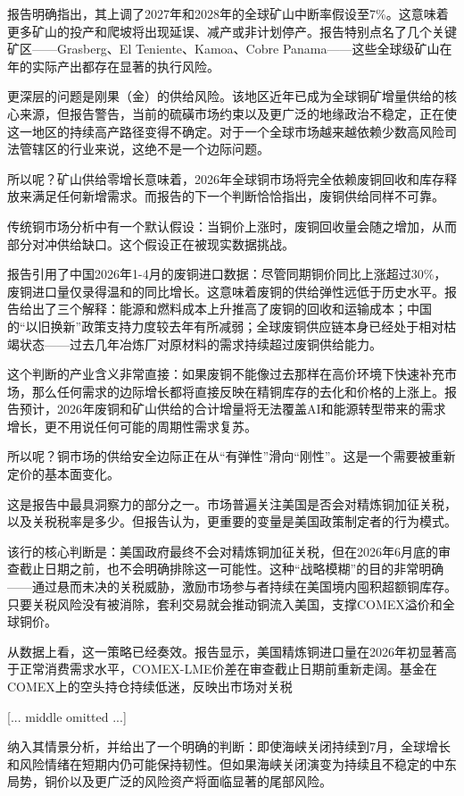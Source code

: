 \documentclass[11pt]{ctexart}
\begin{document}
报告明确指出，其上调了2027年和2028年的全球矿山中断率假设至7\%。这意味着更多矿山的投产和爬坡将出现延误、减产或非计划停产。报告特别点名了几个关键矿区——Grasberg、El Teniente、Kamoa、Cobre Panama——这些全球级矿山在 年的实际产出都存在显著的执行风险。

更深层的问题是刚果（金）的供给风险。该地区近年已成为全球铜矿增量供给的核心来源，但报告警告，当前的硫磺市场约束以及更广泛的地缘政治不稳定，正在使这一地区的持续高产路径变得不确定。对于一个全球市场越来越依赖少数高风险司法管辖区的行业来说，这绝不是一个边际问题。

所以呢？矿山供给零增长意味着，2026年全球铜市场将完全依赖废铜回收和库存释放来满足任何新增需求。而报告的下一个判断恰恰指出，废铜供给同样不可靠。

传统铜市场分析中有一个默认假设：当铜价上涨时，废铜回收量会随之增加，从而部分对冲供给缺口。这个假设正在被现实数据挑战。

报告引用了中国2026年1-4月的废铜进口数据：尽管同期铜价同比上涨超过30\%，废铜进口量仅录得温和的同比增长。这意味着废铜的供给弹性远低于历史水平。报告给出了三个解释：能源和燃料成本上升推高了废铜的回收和运输成本；中国的“以旧换新”政策支持力度较去年有所减弱；全球废铜供应链本身已经处于相对枯竭状态——过去几年冶炼厂对原材料的需求持续超过废铜供给能力。

这个判断的产业含义非常直接：如果废铜不能像过去那样在高价环境下快速补充市场，那么任何需求的边际增长都将直接反映在精铜库存的去化和价格的上涨上。报告预计，2026年废铜和矿山供给的合计增量将无法覆盖AI和能源转型带来的需求增长，更不用说任何可能的周期性需求复苏。

所以呢？铜市场的供给安全边际正在从“有弹性”滑向“刚性”。这是一个需要被重新定价的基本面变化。

这是报告中最具洞察力的部分之一。市场普遍关注美国是否会对精炼铜加征关税，以及关税税率是多少。但报告认为，更重要的变量是美国政策制定者的行为模式。

该行的核心判断是：美国政府最终不会对精炼铜加征关税，但在2026年6月底的审查截止日期之前，也不会明确排除这一可能性。这种“战略模糊”的目的非常明确——通过悬而未决的关税威胁，激励市场参与者持续在美国境内囤积超额铜库存。只要关税风险没有被消除，套利交易就会推动铜流入美国，支撑COMEX溢价和全球铜价。

从数据上看，这一策略已经奏效。报告显示，美国精炼铜进口量在2026年初显著高于正常消费需求水平，COMEX-LME价差在审查截止日期前重新走阔。基金在COMEX上的空头持仓持续低迷，反映出市场对关税

[... middle omitted ...]

纳入其情景分析，并给出了一个明确的判断：即使海峡关闭持续到7月，全球增长和风险情绪在短期内仍可能保持韧性。但如果海峡关闭演变为持续且不稳定的中东局势，铜价以及更广泛的风险资产将面临显著的尾部风险。
\end{document}
